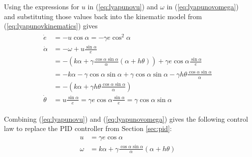 Using the expressions for $u$ in (\ref{eq:lyapunovu}) and $\omega$ in (\ref{eq:lyapunovomega}) and substituting those values back into the kinematic model from (\ref{eq:lyapunovkinematics}) gives
\begin{align}
\label{eq:lyapunovfinalkinematics}
\begin{split}
\dot{e} &= -u\cos\alpha = -\gamma e\cos^2\alpha \\
\dot{\alpha} &= -\omega + u\frac{\sin\alpha}{e} \\
&= -(k\alpha+\gamma\frac{\cos\alpha\sin\alpha}{\alpha}(\alpha+h\theta))+\gamma e\cos\alpha\frac{\sin\alpha}{e} \\
&= -k\alpha-\gamma\cos\alpha\sin\alpha+\gamma\cos\alpha\sin\alpha-\gamma h\theta\frac{\cos\alpha\sin\alpha}{\alpha} \\
&= -\left(k\alpha + \gamma h\theta\frac{\cos\alpha\sin\alpha}{\alpha}\right) \\
\dot{\theta} &= u\frac{\sin\alpha}{e} = \gamma e\cos\alpha\frac{\sin\alpha}{e} = \gamma\cos\alpha\sin\alpha
\end{split}
\end{align}

Combining (\ref{eq:lyapunovu}) and (\ref{eq:lyapunovomega}) gives the following control law to replace the PID controller from Section \ref{sec:pid}:
\begin{align}
\label{eq:lyapunovControlLaw}
\begin{split}
u &= \gamma e\cos\alpha \\
\omega &= k\alpha + \gamma\frac{\cos\alpha\sin\alpha}{\alpha}\left(\alpha+h\theta\right)
\end{split}
\end{align}

